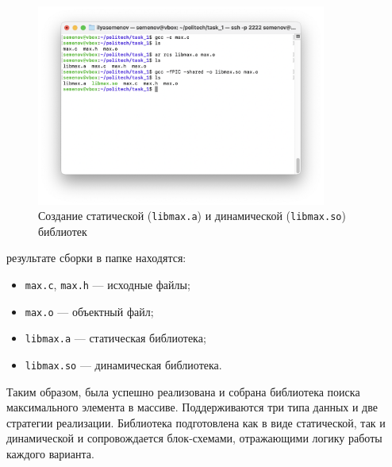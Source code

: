 \begin{figure}[H]
\centering
\includegraphics[width=0.85\textwidth]{img/Screenshot_2025-06-20_at_01.10.14.png}
\caption{Создание статической (\texttt{libmax.a}) и динамической (\texttt{libmax.so}) библиотек}
\end{figure}

 результате сборки в папке находятся:
\begin{itemize}[noitemsep]
  \item \texttt{max.c}, \texttt{max.h} — исходные файлы;
  \item \texttt{max.o} — объектный файл;
  \item \texttt{libmax.a} — статическая библиотека;
  \item \texttt{libmax.so} — динамическая библиотека.
\end{itemize}

Таким образом, была успешно реализована и собрана библиотека поиска максимального элемента в массиве. Поддерживаются три типа данных и две стратегии реализации. Библиотека подготовлена как в виде статической, так и динамической и сопровождается блок-схемами, отражающими логику работы каждого варианта.

